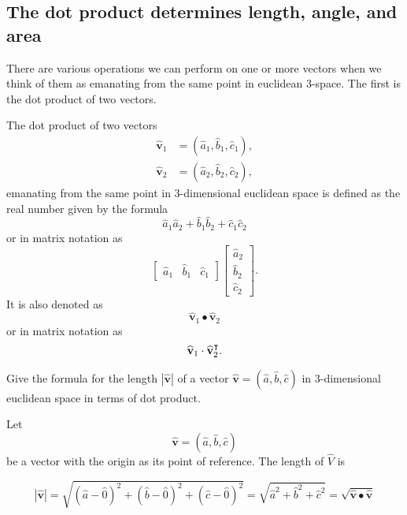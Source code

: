 \documentclass[newpage,hints,handout]{ximera}
\begin{document}
\subsection{The dot product determines length, angle, and area}

There are various operations we can perform on one or more vectors when we
think of them as emanating from the same point in euclidean $3$-space. The
first is the dot product of two vectors.

\begin{definition}
The dot product of two vectors%
\begin{align*}
\hat{\mathbf v}_{1}  &  =(\hat{a}_{1},\hat{b}_{1},\hat{c}_{1}), \\
\hat{\mathbf v}_{2}  &  =(\hat{a}_{2},\hat{b}_{2},\hat{c}_{2}),
\end{align*}
emanating from the same point in 3-dimensional euclidean space is
defined as the real number given by the formula%
\[
\hat{a}_{1}\hat{a}_{2}+\hat{b}_{1}\hat{b}_{2}+\hat{c}_{1}\hat{c}_{2}%
\]
or in matrix notation as%
\[
\begin{bmatrix}
\hat{a}_{1} & \hat{b}_{1} & \hat{c}_{1}%
\end{bmatrix}
\begin{bmatrix}
\hat{a}_{2}\\
\hat{b}_{2}\\
\hat{c}_{2}%
\end{bmatrix}.
\]
It is also denoted as%
\[
\hat{\mathbf v}_{1}\bullet\hat{\mathbf v}_{2}%
\]
or in matrix notation as%
\[
\widehat{\mathbf v}_{1}\cdot \widehat{\mathbf v}_{2}^\intercal.
\]

\end{definition}

\begin{problem}
  Give the formula for the length $\left\vert \hat{\mathbf v}\right\vert $ of a
  vector $\hat{\mathbf v}=(\hat{a},\hat{b},\hat{c})$ in 3-dimensional
  euclidean space in terms of dot product.

\begin{onlineOnly}
\end{onlineOnly}

\begin{freeResponse}
Let 
\[
\hat{\mathbf v}=\left(  \hat{a},\hat{b},\hat{c}\right)
\]
be a vector with the origin as its point of reference. The length of $\hat{V}$ is

\[
\left\vert \hat{\mathbf v}\right\vert=\sqrt{(\hat{a}-\hat{0})^{2}+
  (\hat{b}-\hat{0})^{2}+(\hat{c}-\hat{0})^{2}} \label{0}
= \sqrt{\hat{a}^2+\hat{b}^2+\hat{c}^2}=\sqrt{\hat{\mathbf v}\bullet\hat{\mathbf v}}
\]
\end{freeResponse}
\end{problem}
\end{document}
